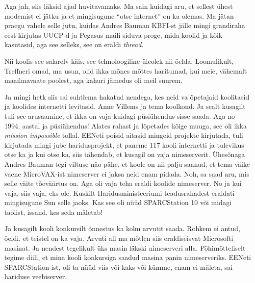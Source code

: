 Aga jah, siis läksid ajad huvitavamaks. Ma sain kuidagi aru, et sellest ühest 
modemist ei jätku ja et mingisugune \enquote{otse internet} on ka olemas. Ma 
jätan praegu vahele selle jutu, kuidas Andres Bauman 
KBFI-st jälle mingi grandiraha eest kirjutas UUCP-d ja Pegasus maili siduva 
proge, mida koolid ja kõik kasutasid, aga see selleks, see on eraldi 
\emph{thread}. 

Nii koolis see salarelv käis, see tehnoloogiline üleolek nii-öelda. 
Loomulikult, Treffneri omad, ma usun, olid ikka mõnes mõttes haritumad, kui 
meie, vähemalt maailmavaate poolest, aga kahuri jämedus oli meil suurem. 

Ja mingi hetk siis sai suhtlema hakatud nendega, kes neid va õpetajaid 
koolitasid ja koolides internetti levitasid. Anne Villems ja tema  koolkond. Ja sealt kusagilt tuli see arusaamine, et ikka on vaja 
kuidagi püsiühendus sisse saada. Aga no 1994. aastal ja püsiühendus! Alates 
rahast ja lõpetades kõige muuga, see oli ikka \emph{mission impossible} tollal. 
EENeti poisid aitasid mingeid projekte kirjutada, tuli kirjutada mingi jube 
haridusprojekt, et paneme 117 kooli internetti ja tulevikus otse ka ja kui otse 
ka, siis tähendab, et kusagil on vaja nimeserverit. Ühesõnaga Andres 
Bauman tegi viltuse näo pähe, et koole on nii palju 
saanud, et tema väike vaene MicroVAX-ist nimeserver ei jaksa neid enam pidada. 
Noh, sa saad aru, mis selle väite tõeväärtus on. Aga oli vaja teha eraldi koolide nimeserver. No ja kui 
vaja, siis vaja, eks ole. Kuskilt Haridusministeeriumi teadusrahadest eraldati 
mingisugune Sun selle jaoks. Kas see oli nüüd SPARCStation 
10 või midagi taolist, issand, kes seda mäletab! 

Ja kusagilt kooli konkursilt õnnestus ka kolm arvutit saada. Rohkem ei antud, 
öeldi, et teistel on ka vaja. Arvuti all ma  mõtlen siis eraldiseisvat 
Microsofti masinat. Ja nendest  tegelikult üks masin läkski nimeserveri alla. 
Põhimõtteliselt tegime diili, et mina kooli konkursiga saadud masina panin 
nimeserveriks. EENeti SPARCStation-ist, oli ta nüüd viis või kaks või kümme, 
enam ei mäleta, sai hariduse veebiserver. 

